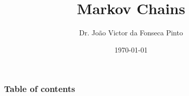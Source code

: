 \documentclass{beamer}
\begin{document}
\title{Markov Chains}  
\author{Dr. João Victor da Fonseca Pinto}
\date{\today} 

\begin{frame}
\titlepage
\end{frame}

\begin{frame}
    \frametitle{Table of contents}
    \tableofcontents
\end{frame} 


\end{document}
